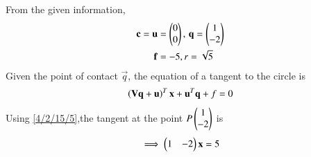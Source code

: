 







From the given information, 
\begin{align}
    \mathbf{c} = \mathbf{u}&=\begin{pmatrix}0\\0\end{pmatrix},\, \mathbf{q}= \begin{pmatrix}1\\-2\end{pmatrix}\\
    \mathbf{f}&=-5, r= \sqrt{5}
\end{align}
Given the point of contact $\vec{q}$, the equation of a tangent to the circle is 
\begin{align}
\left(\mathbf{V}\mathbf{q}+\mathbf{u}\right)^T\mathbf{x}+\mathbf{u}^T\mathbf{q}+f = 0
\label{4/2/15/5}
\end{align}
Using \eqref{4/2/15/5},the  tangent at the point $P\begin{pmatrix}1\\-2\end{pmatrix}$ is
\begin{align}
    \implies \begin{pmatrix}1&-2\end{pmatrix}\mathbf{x}= 5
\end{align}


